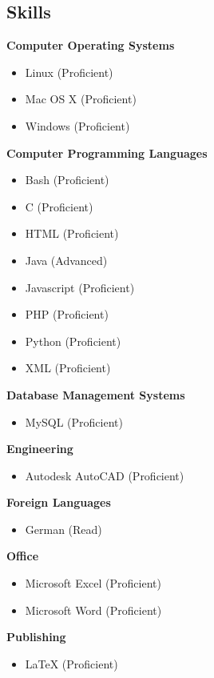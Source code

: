 \documentclass{res}
\begin{document}
\begin{resume}
\section{Skills}          
    \textbf{Computer Operating Systems}
        \begin{itemize}
 	        \item Linux (Proficient)
            \item Mac OS X (Proficient)
            \item Windows (Proficient)
        \end{itemize}
    \textbf{Computer Programming Languages}
        \begin{itemize}
            \item Bash (Proficient)
            \item C (Proficient)
            \item HTML (Proficient)
 	        \item Java (Advanced)
            \item Javascript (Proficient)
            \item PHP (Proficient)
 	        \item Python (Proficient)
            \item XML (Proficient)
        \end{itemize}
    \textbf{Database Management Systems}
        \begin{itemize}
 	        \item MySQL (Proficient)
        \end{itemize}
    \textbf{Engineering}
        \begin{itemize}
 	        \item Autodesk AutoCAD (Proficient)
        \end{itemize}
    \textbf{Foreign Languages}
        \begin{itemize}
 	        \item German (Read)
        \end{itemize}
    \textbf{Office}
        \begin{itemize}
            \item Microsoft Excel (Proficient)
 	        \item Microsoft Word (Proficient)
        \end{itemize}
    \textbf{Publishing}
        \begin{itemize}
 	        \item \LaTeX{} (Proficient)
        \end{itemize}


\end{resume}
\end{document}
